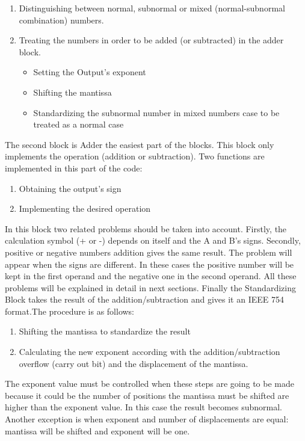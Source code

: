 \documentclass{scrreprt}
\begin{document}
\begin{enumerate}
    \item Distinguishing between normal, subnormal or mixed (normal-subnormal combination) numbers.
    \item Treating the numbers in order to be added (or subtracted) in the adder block.
        \begin{itemize}
            \item Setting the Output’s exponent
            \item Shifting the mantissa
            \item Standardizing the subnormal number in mixed numbers case to be treated as a normal case
        \end{itemize}
\end{enumerate}
The second block is Adder the easiest part of the blocks. This block only implements the operation (addition or subtraction). Two functions are implemented in this part of the code:
\begin{enumerate}
    \item Obtaining the output’s sign
    \item Implementing the desired operation 
\end{enumerate}
In this block two related problems should be taken into account. Firstly, the calculation symbol (+ or -) depends on itself and the A and B’s signs. Secondly, positive or negative numbers addition gives the same result. The problem will appear when the signs are different. In these cases the positive number will be kept in the first operand and the negative one in the second operand. All these problems will be explained in detail in next sections.
\break \hfill
Finally the Standardizing Block takes the result of the addition/subtraction and gives it an IEEE 754 format.The procedure is as follows:
\begin{enumerate}
    \item Shifting the mantissa to standardize the result
    \item Calculating the new exponent according with the addition/subtraction overflow (carry out bit) and the displacement of the mantissa. 
\end{enumerate}
The exponent value must be controlled when these steps are going to be made because it could be the number of positions the mantissa must be shifted are higher than the exponent value. In this case the result becomes subnormal. Another exception is when exponent and number of displacements are equal: mantissa will be shifted and exponent will be one.
\newpage
{} 
\end{document}
